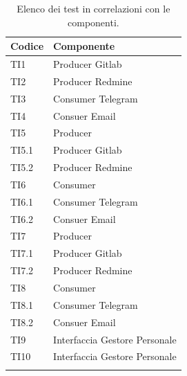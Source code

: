 	\begin{table}[H]
		\centering
		{\def\arraystretch{1.4}
		\begin{tabularx}{0.7\textwidth}{YY}
			\textbf{Codice} & \textbf{Componente} \\
			\toprule
			TI1 & Producer Gitlab \\
			TI2 & Producer Redmine \\
			TI3 & Consumer Telegram \\
			TI4 & Consuer Email \\
			TI5 & Producer \\
			TI5.1 & Producer Gitlab \\
			TI5.2 & Producer Redmine \\
			TI6 & Consumer \\
			TI6.1 & Consumer Telegram \\
			TI6.2 & Consuer Email \\
			TI7 & Producer \\
			TI7.1 & Producer Gitlab \\
			TI7.2 & Producer Redmine \\
			TI8 & Consumer \\
			TI8.1 & Consumer Telegram \\
			TI8.2 & Consuer Email \\
			TI9 & Interfaccia Gestore Personale \\
			TI10 & Interfaccia Gestore Personale \\
			\bottomrule\\
		\end{tabularx}}
		\caption{Elenco dei test in correlazioni con le componenti.}
	\end{table}
